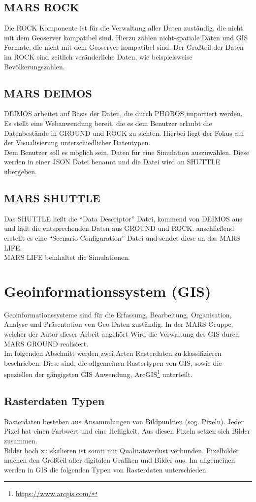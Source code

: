 \documentclass[10pt,conference,compsocconf]{IEEEtran}
\begin{document}
\subsection{MARS ROCK}
Die ROCK Komponente ist für die Verwaltung aller Daten zuständig, die nicht mit dem Geoserver kompatibel sind. Hierzu zählen nicht-spatiale Daten und GIS Formate, die nicht mit dem Geoserver kompatibel sind. Der Großteil der Daten im ROCK sind zeitlich veränderliche Daten, wie beispielsweise Bevölkerungszahlen.

\subsection{MARS DEIMOS}
DEIMOS arbeitet auf Basis der Daten, die durch PHOBOS importiert werden. Es stellt eine Webanwendung bereit, die es dem Benutzer erlaubt die Datenbestände in GROUND und ROCK zu sichten. Hierbei liegt der Fokus auf der Visualisierung unterschiedlicher Datentypen.\\
Dem Benutzer soll es möglich sein, Daten für eine Simulation auszuwählen. Diese werden in einer JSON Datei benannt und die Datei wird an SHUTTLE übergeben.

\subsection{MARS SHUTTLE}
Das SHUTTLE ließt die \enquote{Data Descriptor} Datei, kommend von DEIMOS aus und lädt die entsprechenden Daten aus GROUND und ROCK. anschließend erstellt es eine \enquote{Scenario Configuration} Datei und sendet diese an das MARS LIFE.\\
MARS LIFE beinhaltet die Simulationen.


\section{Geoinformationssystem (GIS)}
Geoinformationssysteme sind für die Erfassung, Bearbeitung, Organisation, Analyse und Präsentation von Geo-Daten zuständig. In der MARS Gruppe, welcher der Autor dieser Arbeit angehört Wird die Verwaltung des GIS durch MARS GROUND realisiert.\\
Im folgenden Abschnitt werden zwei Arten Rasterdaten zu klassifizieren beschrieben. Diese sind, die allgemeinen Rastertypen von GIS, sowie die speziellen der gängigsten GIS Anwendung, ArcGIS\footnote{\url{https://www.arcgis.com/}} unterteilt.

\subsection{Rasterdaten Typen}
Rasterdaten bestehen aus Ansammlungen von Bildpunkten (sog. Pixeln). Jeder Pixel hat einen Farbwert und eine Helligkeit. Aus diesen Pixeln setzen sich Bilder zusammen.\\
Bilder hoch zu skalieren ist somit mit Qualitätsverlust verbunden. Pixelbilder machen den Großteil aller digitalen Grafiken und Bilder aus. Im allgemeinen werden in GIS die folgenden Typen von Rasterdaten unterschieden\cite{mariuszMaster}.
\end{document}

